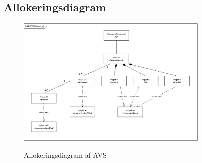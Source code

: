\subsection{Allokeringsdiagram}

\begin{figure}[H]
	\centering
	\includegraphics[width=0.82\textwidth]{Systemarkitektur/System/AVS_Allokeringsdiagram.png}
	\label{fig:System BDD}
	\caption{Allokeringsdiagram af AVS}
\end{figure}







